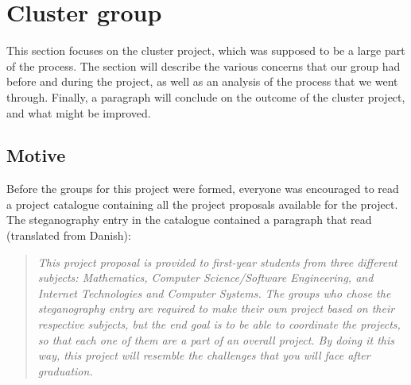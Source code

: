 \section{Cluster group}
This section focuses on the cluster project, which was supposed to be a large part of the process. The section will describe the various concerns that our group had before and during the project, as well as an analysis of the process that we went through. Finally, a paragraph will conclude on the outcome of the cluster project, and what might be improved.

\subsection*{Motive}
Before the groups for this project were formed, everyone was encouraged to read a project catalogue containing all the project proposals available for the project.
The steganography entry in the catalogue contained a paragraph that read (translated from Danish):
\begin{quote}\textit{This project proposal is provided to first-year students from three different subjects: Mathematics, Computer Science/Software Engineering, and Internet Technologies and Computer Systems. The groups who chose the steganography entry are required to make their own project based on their respective subjects, but the end goal is to be able to coordinate the projects, so that each one of them are a part of an overall project. By doing it this way, this project will resemble the challenges that you will face after graduation.}\end{quote}


